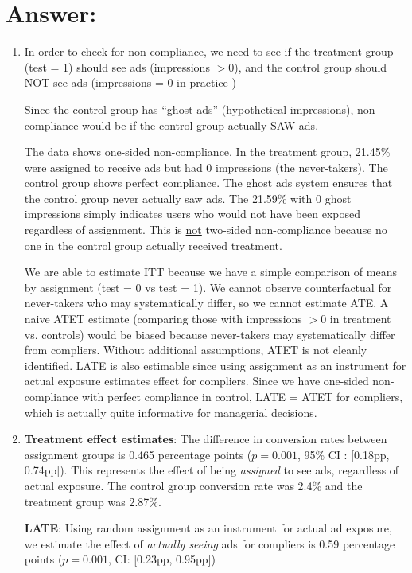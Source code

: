 \documentclass[10pt]{article}
\begin{document}
\section{Answer:}
\begin{enumerate}
    \item In order to check for non-compliance, we need to see if the treatment group (test = 1) should see ads (impressions $> 0$), and the control group should NOT see ads (impressions = 0 in practice )

    Since the control group has ``ghost ads'' (hypothetical impressions), non-compliance would be if the control group actually SAW ads. 

    The data shows one-sided non-compliance. In the treatment group, 21.45\% were assigned to receive ads but had 0 impressions (the never-takers). The control group shows perfect compliance. The ghost ads system ensures that the control group never actually saw ads. The 21.59\% with 0 ghost impressions simply indicates users who would not have been exposed regardless of assignment. This is \underline{not} two-sided non-compliance because no one in the control group actually received treatment. 

    We are able to estimate ITT because we have a simple comparison of means by assignment (test = 0 vs test = 1). We cannot observe counterfactual for never-takers who may systematically differ, so we cannot estimate ATE. A naive ATET estimate (comparing those with impressions $> 0 $ in treatment vs. controls) would be biased because never-takers may systematically differ from compliers. Without additional assumptions, ATET is not cleanly identified. LATE is also estimable since using assignment as an instrument for actual exposure estimates effect for compliers. Since we have one-sided non-compliance with perfect compliance in control, LATE = ATET for compliers, which is actually quite informative for managerial decisions. 
    \newpage 
    \item \textbf{Treatment effect estimates}: The difference in conversion rates between assignment groups is 0.465 percentage points ($p = 0.001$, 95\% CI : [0.18pp, 0.74pp]). This represents the effect of being \textit{assigned} to see ads, regardless of actual exposure. The control group conversion rate was 2.4\% and the treatment group was 2.87\%. 

    \textbf{LATE}: Using random assignment as an instrument for actual ad exposure, we estimate the effect of \textit{actually seeing} ads for compliers is 0.59 percentage points ($p = 0.001$, CI: [0.23pp, 0.95pp])


\end{enumerate}
\end{document}
